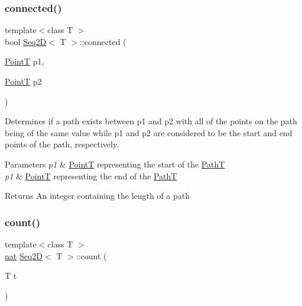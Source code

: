 \subsubsection{\texorpdfstring{connected()}{connected()}}
{\footnotesize\ttfamily template$<$class T $>$ \\
bool \mbox{\hyperlink{class_seq2_d}{Seq2D}}$<$ T $>$\+::connected (\begin{DoxyParamCaption}\item[{\mbox{\hyperlink{class_point_t}{PointT}}}]{p1,  }\item[{\mbox{\hyperlink{class_point_t}{PointT}}}]{p2 }\end{DoxyParamCaption})}



Determines if a path exists between p1 and p2 with all of the points on the path being of the same value while p1 and p2 are considered to be the start and end points of the path, respectively. 


\begin{DoxyParams}{Parameters}
{\em p1} & \mbox{\hyperlink{class_point_t}{PointT}} representing the start of the \mbox{\hyperlink{class_path_t}{PathT}} \\
\hline
{\em p1} & \mbox{\hyperlink{class_point_t}{PointT}} representing the end of the \mbox{\hyperlink{class_path_t}{PathT}} \\
\hline
\end{DoxyParams}
\begin{DoxyReturn}{Returns}
An integer containing the length of a path 
\end{DoxyReturn}
\mbox{\label{class_seq2_d_a7c1a0f4d5c1c27c0ad123f86e6b54904}} 
\subsubsection{\texorpdfstring{count()}{count()}\hspace{0.1cm}{\footnotesize\ttfamily [1/3]}}
{\footnotesize\ttfamily template$<$class T $>$ \\
\mbox{\hyperlink{_path_a_d_t_8h_a56638ee9d162e8cce3a15f92d2023d6e}{nat}} \mbox{\hyperlink{class_seq2_d}{Seq2D}}$<$ T $>$\+::count (\begin{DoxyParamCaption}\item[{T}]{t }\end{DoxyParamCaption})}



